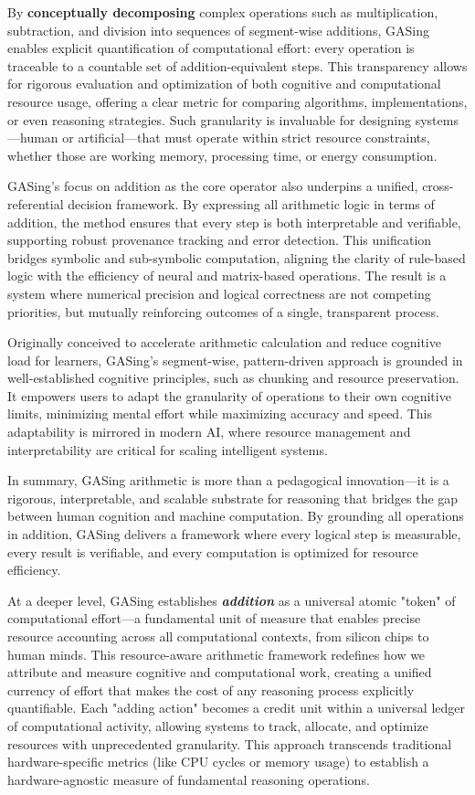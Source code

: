 By \textbf{conceptually decomposing} complex operations such as multiplication, subtraction, and division into sequences of segment-wise additions, GASing enables explicit quantification of computational effort: every operation is traceable to a countable set of addition-equivalent steps. This transparency allows for rigorous evaluation and optimization of both cognitive and computational resource usage, offering a clear metric for comparing algorithms, implementations, or even reasoning strategies. Such granularity is invaluable for designing systems—human or artificial—that must operate within strict resource constraints, whether those are working memory, processing time, or energy consumption.

GASing’s focus on addition as the core operator also underpins a unified, cross-referential decision framework. By expressing all arithmetic logic in terms of addition, the method ensures that every step is both interpretable and verifiable, supporting robust provenance tracking and error detection. This unification bridges symbolic and sub-symbolic computation, aligning the clarity of rule-based logic with the efficiency of neural and matrix-based operations. The result is a system where numerical precision and logical correctness are not competing priorities, but mutually reinforcing outcomes of a single, transparent process.

Originally conceived to accelerate arithmetic calculation and reduce cognitive load for learners, GASing’s segment-wise, pattern-driven approach is grounded in well-established cognitive principles, such as chunking and resource preservation. It empowers users to adapt the granularity of operations to their own cognitive limits, minimizing mental effort while maximizing accuracy and speed. This adaptability is mirrored in modern AI, where resource management and interpretability are critical for scaling intelligent systems.

In summary, GASing arithmetic is more than a pedagogical innovation—it is a rigorous, interpretable, and scalable substrate for reasoning that bridges the gap between human cognition and machine computation. By grounding all operations in addition, GASing delivers a framework where every logical step is measurable, every result is verifiable, and every computation is optimized for resource efficiency.

At a deeper level, GASing establishes \textbf{\textbf{\textit{addition}}} as a universal atomic "token" of computational effort—a fundamental unit of measure that enables precise resource accounting across all computational contexts, from silicon chips to human minds. This resource-aware arithmetic framework redefines how we attribute and measure cognitive and computational work, creating a unified currency of effort that makes the cost of any reasoning process explicitly quantifiable. Each "adding action" becomes a credit unit within a universal ledger of computational activity, allowing systems to track, allocate, and optimize resources with unprecedented granularity. This approach transcends traditional hardware-specific metrics (like CPU cycles or memory usage) to establish a hardware-agnostic measure of fundamental reasoning operations.

